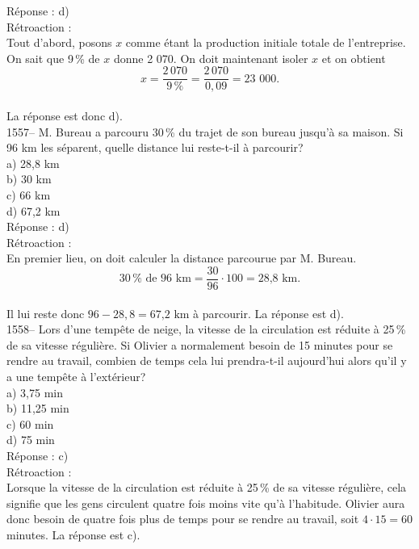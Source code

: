 R\'eponse : d)\\

R\'etroaction :\\
Tout d'abord, posons $x$ comme \'etant la production initiale totale
de l'entreprise. On sait que 9\,\% de $x$ donne {\textrm{2 070}}. On
doit maintenant isoler $x$ et on obtient
\\$$x=\frac{2\,070}{9\,\%}=\frac{2\,070}{0,09}={\textrm{23 000.}}$$\\
La r\'eponse est donc d).\\

1557-- M. Bureau a parcouru 30\,\% du trajet de son bureau jusqu'\`a
sa maison. Si 96 km les s\'eparent, quelle distance lui reste-t-il
\`a
parcourir?\\
a) 28,8 km\\
b) 30 km\\
c) 66 km\\
d) 67,2 km \\

R\'eponse : d)\\

R\'etroaction :\\
En premier lieu, on doit calculer la distance parcourue par M.
Bureau. $$30\,\%{\textrm{ de 96 km}}=\frac{30}{96}\cdot
100={\textrm{28,8 km.}}$$\\ Il lui reste donc $96 - 28,8=
{\textrm{67,2
km }}$\`a parcourir. La r\'eponse est d).\\

1558-- Lors d'une temp\^ete de neige, la vitesse de la circulation
est r\'eduite \`a 25\,\% de sa vitesse r\'eguli\`ere. Si Olivier a
normalement besoin de 15 minutes pour se rendre au travail, combien
de temps cela lui prendra-t-il aujourd'hui
alors qu'il y a une temp\^ete \`a l'ext\'erieur?\\
a) 3,75 min\\
b) 11,25 min \\
c) 60 min\\
d) 75 min\\

R\'eponse : c)\\

R\'etroaction :\\
Lorsque la vitesse de la circulation est r\'eduite \`a 25\,\% de sa
vitesse r\'eguli\`ere, cela signifie que les gens circulent quatre
fois moins vite qu'\`a l'habitude. Olivier aura donc besoin de
quatre fois plus de temps pour se rendre au travail, soit
$4\cdot15=60${\textrm{ minutes.}}
La r\'eponse est c). \\

